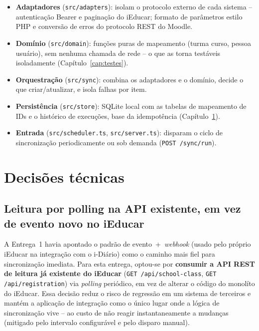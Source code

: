 \documentclass[
	12pt, openright, twoside, a4paper,
	english,
	brazil
	]{abntex2}
\begin{document}
\begin{itemize}
  \item \textbf{Adaptadores} (\texttt{src/adapters}): isolam o protocolo externo de cada sistema
  -- autentica\c{c}\~ao Bearer e pagina\c{c}\~ao do iEducar; formato de par\^ametros estilo PHP e
  convers\~ao de erros do protocolo REST do Moodle.
  \item \textbf{Dom\'inio} (\texttt{src/domain}): fun\c{c}\~oes puras de mapeamento (turma
  \textrightarrow{} curso, pessoa \textrightarrow{} usu\'ario), sem nenhuma chamada de rede --
  o que as torna test\'aveis isoladamente (Cap\'itulo~\ref{cap:testes}).
  \item \textbf{Orquestra\c{c}\~ao} (\texttt{src/sync}): combina os adaptadores e o dom\'inio,
  decide o que criar/atualizar, e isola falhas por item.
  \item \textbf{Persist\^encia} (\texttt{src/store}): SQLite local com as tabelas de mapeamento de
  IDs e o hist\'orico de execu\c{c}\~oes, base da idempot\^encia (Cap\'itulo~\ref{cap:decisoes}).
  \item \textbf{Entrada} (\texttt{src/scheduler.ts}, \texttt{src/server.ts}): disparam o ciclo de
  sincroniza\c{c}\~ao periodicamente ou sob demanda (\texttt{POST /sync/run}).
\end{itemize}

\chapter{Decis\~oes t\'ecnicas}
\label{cap:decisoes}

\section{Leitura por polling na API existente, em vez de evento novo no iEducar}

A Entrega~1 havia apontado o padr\~ao de evento~+~\emph{webhook} (usado pelo pr\'oprio iEducar na
integra\c{c}\~ao com o i-Di\'ario) como o caminho mais fiel para sincroniza\c{c}\~ao imediata.
Para esta entrega, optou-se por \textbf{consumir a API REST de leitura j\'a existente do iEducar}
(\texttt{GET /api/school-class}, \texttt{GET /api/registration}) via \emph{polling} peri\'odico,
em vez de alterar o c\'odigo do monol\'ito do iEducar. Essa decis\~ao reduz o risco de regress\~ao
em um sistema de terceiros e mant\'em a aplica\c{c}\~ao de integra\c{c}\~ao como o \'unico lugar
onde a l\'ogica de sincroniza\c{c}\~ao vive -- ao custo de n\~ao reagir instantaneamente a
mudan\c{c}as (mitigado pelo intervalo configur\'avel e pelo disparo manual).
\end{document}
